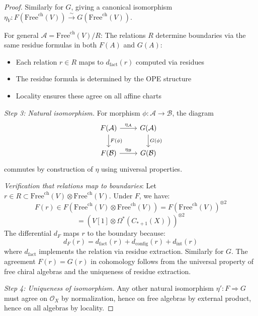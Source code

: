 \begin{proof}
Similarly for $G$, giving a canonical isomorphism $\eta_{V}\colon F(\text{Free}^{\text{ch}}(V)) \xrightarrow{\sim} G(\text{Free}^{\text{ch}}(V))$.

For general $\mathcal{A} = \text{Free}^{\text{ch}}(V)/R$:
The relations $R$ determine boundaries via the same residue formulas in both $F(A)$ and $G(A)$:
\begin{itemize}
\item Each relation $r \in R$ maps to $d_{\text{fact}}(r)$ computed via residues
\item The residue formula is determined by the OPE structure
\item Locality ensures these agree on all affine charts
\end{itemize}

\emph{Step 3: Natural isomorphism.}
For morphism $\phi: \mathcal{A} \to \mathcal{B}$, the diagram
\[
\begin{tikzcd}
F(\mathcal{A}) \arrow[r, "\eta_\mathcal{A}"] \arrow[d, "F(\phi)"] & G(\mathcal{A}) \arrow[d, "G(\phi)"]\\
F(\mathcal{B}) \arrow[r, "\eta_\mathcal{B}"] & G(\mathcal{B})
\end{tikzcd}
\]
commutes by construction of $\eta$ using universal properties.

\emph{Verification that relations map to boundaries}: Let $r \in R \subset \text{Free}^{\text{ch}}(V) \otimes \text{Free}^{\text{ch}}(V)$.
Under $F$, we have:
\[F(r) \in F(\text{Free}^{\text{ch}}(V) \otimes \text{Free}^{\text{ch}}(V)) = F(\text{Free}^{\text{ch}}(V))^{\otimes 2}\]
\[ = (V[1] \otimes \Omega^*(C_{*+1}(X)))^{\otimes 2}\]
The differential $d_F$ maps $r$ to the boundary because:
\[d_F(r) = d_{\text{fact}}(r) + d_{\text{config}}(r) + d_{\text{int}}(r)\]
where $d_{\text{fact}}$ implements the relation via residue extraction. Similarly for $G$.
The agreement $F(r) = G(r)$ in cohomology follows from the universal property
of free chiral algebras and the uniqueness of residue extraction.

\emph{Step 4: Uniqueness of isomorphism.}
Any other natural isomorphism $\eta': F \Rightarrow G$ must agree on $\mathcal{O}_X$ by normalization,
hence on free algebras by external product, hence on all algebras by locality.
\end{proof}

